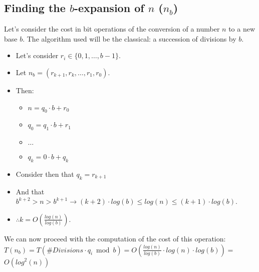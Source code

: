 \subsection{Finding the $b$-expansion of $n$ ($n_{b}$)}
Let's consider the cost in bit operations of the conversion of a number $n$ to a new base $b$. \newline
The algorithm used will be the classical: a succession of divisions by $b$. \newline
\begin{itemize}
    \item Let's consider $r_{i} \in \{0, 1, \dots, b-1\}$.
    \item Let $n_{b} = (r_{k+1}, r_{k}, \dots, r_{1}, r_{0})$.
    \item Then: \begin{itemize}
                    \item $n = q_{0} \cdot b + r_{0}$
                    \item $q_{0} = q_{1} \cdot b + r_{1}$
                    \item $\dots$
                    \item $q_{k} = 0 \cdot b + q_{k}$
                \end{itemize}
    \item Consider then that $q_{k} = r_{k+1}$
    \item And that $b^{k+2} > n > b^{k+1} \rightarrow (k+2) \cdot log(b) \leq log(n) \leq (k+1) \cdot log(b)$.
    \item $\therefore k = O(\frac{log(n)}{log(b)})$.
\end{itemize}
We can now proceed with the computation of the cost of this operation: \newline
$T(n_{b}) = T(\#Divisions \cdot q_{i} \bmod b) = O(\frac{log(n)}{log(b)} \cdot log(n) \cdot log(b)) = $ \\
$O(log^{2}(n))$

